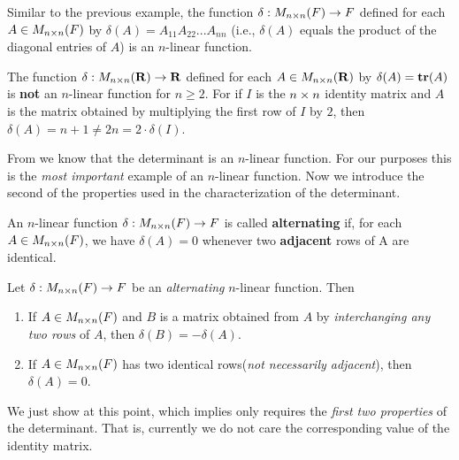 \begin{example} \label{example 4.5.3}
Similar to the previous example, the function \(\delta: M_{n \times n}(F) \to F\) defined for each \(A \in M_{n \times n}(F)\) by \(\delta(A) = A_{11}A_{22} ... A_{nn}\) (i.e., \(\delta(A)\) equals the product of the diagonal entries of \(A\)) is an \(n\)-linear function.
\end{example}

\begin{example} \label{example 4.5.4}
The function \(\delta: M_{n \times n}(\mathbf{R}) \to \mathbf{R}\) defined for each \(A \in M_{n \times n}(\mathbf{R})\) by \(\delta(A) = \textbf{tr}(A)\) is \textbf{not} an \(n\)-linear function for \(n \ge 2\).
For if \(I\) is the \(n \times n\) identity matrix and \(A\) is the matrix obtained by multiplying the first row of \(I\) by \(2\), then \(\delta(A) = n + 1 \ne 2n = 2 \cdot \delta(I)\).
\end{example}

From  we know that the determinant is an \(n\)-linear function.
For our purposes this is the \emph{most important} example of an \(n\)-linear function.
Now we introduce the second of the properties used in the characterization of the determinant.

\begin{definition} \label{def 4.4}
An \(n\)-linear function \(\delta: M_{n \times n}(F) \to F\) is called \textbf{alternating} if, for each \(A \in M_{n \times n}(F)\), we have \(\delta(A) = 0\) whenever two \textbf{adjacent} rows of A are identical.
\end{definition}

\begin{theorem} \label{thm 4.10}
Let \(\delta: M_{n \times n}(F) \to F\) be an \emph{alternating} \(n\)-linear function.
Then
\begin{enumerate}
\item If \(A \in M_{n \times n}(F)\) and \(B\) is a matrix obtained from \(A\) by \emph{interchanging any two rows} of \(A\), then \(\delta(B) = -\delta(A)\).
\item If \(A \in M_{n \times n}(F)\) has two identical rows(\emph{not necessarily adjacent}), then \(\delta(A) = 0\).
\end{enumerate}
\end{theorem}

\begin{note}
We just show  at this point, which implies  only requires the \emph{first two properties} of the determinant.
That is, currently we do not care the corresponding value of the identity matrix.
\end{note}


